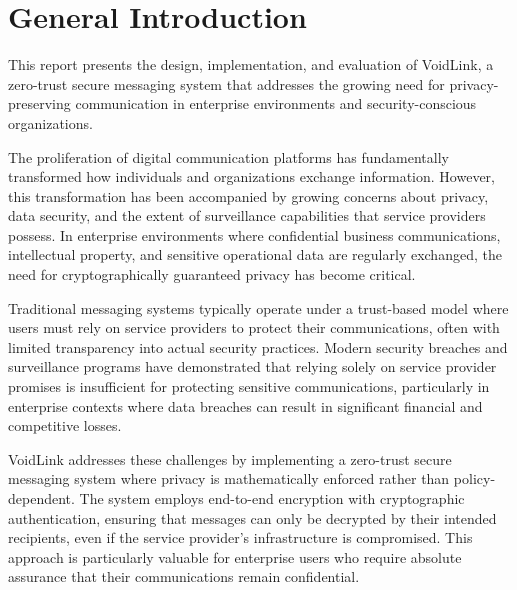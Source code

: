 \documentclass[12pt,a4paper,openany]{book}
\renewcommand{\headrulewidth}{0pt} %
\renewcommand{\headrulewidth}{0.4pt} %
\renewcommand{\headrulewidth}{0.4pt} %
\renewcommand{\headrulewidth}{0.4pt} %
\renewcommand{\headrulewidth}{0pt} %
\begin{document}
\newpage
\pagestyle{fancy} %
\renewcommand{\headrulewidth}{0.4pt} %
\fancyfoot[R]{\thepage} %
\setcounter{page}{1}

\mainmatter

\chapter*{General Introduction}
\thispagestyle{noheaderplain}

This report presents the design, implementation, and evaluation of VoidLink, a zero-trust secure messaging system that addresses the growing need for privacy-preserving communication in enterprise environments and security-conscious organizations.

The proliferation of digital communication platforms has fundamentally transformed how individuals and organizations exchange information. However, this transformation has been accompanied by growing concerns about privacy, data security, and the extent of surveillance capabilities that service providers possess. In enterprise environments where confidential business communications, intellectual property, and sensitive operational data are regularly exchanged, the need for cryptographically guaranteed privacy has become critical.

Traditional messaging systems typically operate under a trust-based model where users must rely on service providers to protect their communications, often with limited transparency into actual security practices. Modern security breaches and surveillance programs have demonstrated that relying solely on service provider promises is insufficient for protecting sensitive communications, particularly in enterprise contexts where data breaches can result in significant financial and competitive losses.

VoidLink addresses these challenges by implementing a zero-trust secure messaging system where privacy is mathematically enforced rather than policy-dependent. The system employs end-to-end encryption with cryptographic authentication, ensuring that messages can only be decrypted by their intended recipients, even if the service provider's infrastructure is compromised. This approach is particularly valuable for enterprise users who require absolute assurance that their communications remain confidential.
\end{document}
